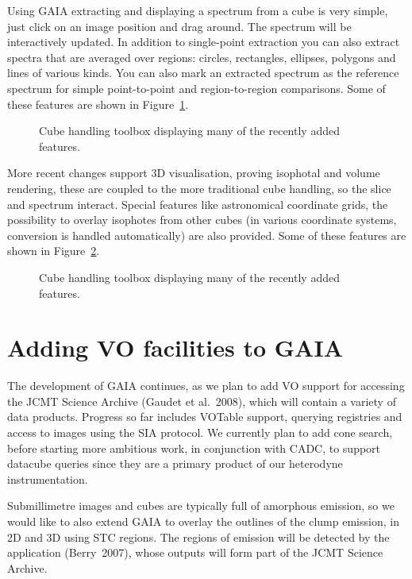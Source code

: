 \documentclass[11pt,twoside]{article}  %
\begin{document}
Using GAIA extracting and displaying a spectrum from a cube is very simple,
just click on an image position and drag around. The spectrum will be
interactively updated.  In addition to single-point extraction you can also
extract spectra that are averaged over regions: circles, rectangles, ellipses,
polygons and lines of various kinds. You can also mark an extracted spectrum
as the reference spectrum for simple point-to-point and region-to-region
comparisons. Some of these features are shown in Figure~\ref{F03-fig1}.

\begin{figure}
\caption{Cube handling toolbox displaying many of the recently added features.}
\label{F03-fig1}
\end{figure}

More recent changes support 3D visualisation, proving isophotal and volume
rendering, these are coupled to the more traditional cube handling, so the
slice and spectrum interact. Special features like astronomical coordinate
grids, the possibility to overlay isophotes from other cubes (in various
coordinate systems, conversion is handled automatically) are also provided.
Some of these features are shown in Figure~\ref{F03-fig2}.

\begin{figure}
\caption{Cube handling toolbox displaying many of the recently added features.}
\label{F03-fig2}
\end{figure}

\section{Adding VO facilities to GAIA}

The development of GAIA continues, as we plan to add VO support for accessing
the JCMT Science Archive (Gaudet et al.\ 2008), which will contain a variety
of data products. Progress so far includes VOTable support, querying
registries and access to images using the SIA protocol. We currently plan to
add cone search, before starting more ambitious work, in conjunction with
CADC, to support datacube queries since they are a primary product of our
heterodyne instrumentation.

Submillimetre images and cubes are typically full of amorphous emission, so we
would like to also extend GAIA to overlay the outlines of the clump emission,
in 2D and 3D using STC regions. The regions of emission will be detected by
the  application
(Berry\ 2007), whose outputs will form part of the JCMT Science Archive.
\end{document}
